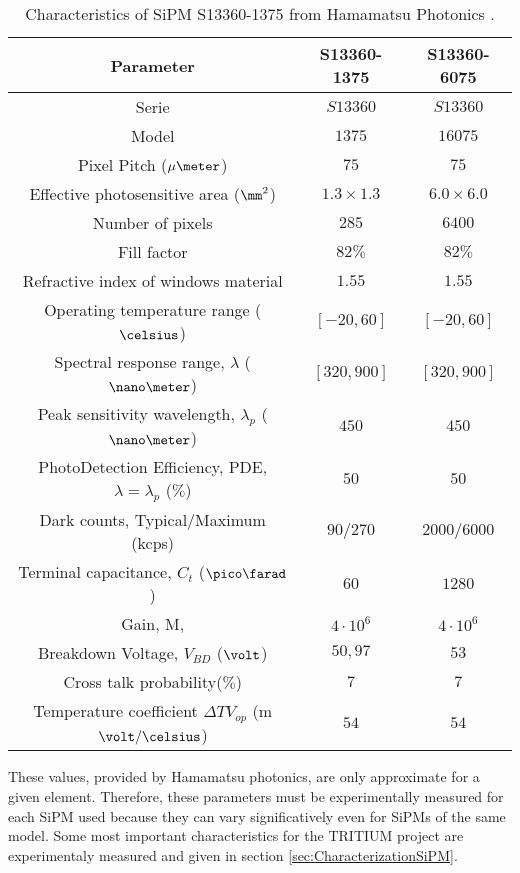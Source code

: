 \begin{table}[h]
\begin{center}
\begin{tabular}{|c|c|c|}
\hline
Parameter & S13360-1375 & S13360-6075 \\
\hline \hline \hline
Serie & $S13360$ & $S13360$ \\ \hline
Model & $1375$ & $16075$ \\ \hline
Pixel Pitch ($\mu\meter$) & $75$ & $75$ \\ \hline
Effective photosensitive area ($\mm^2$) & $1.3 \times 1.3$ & $6.0 \times 6.0$ \\ \hline
Number of pixels & $285$ & $6400$ \\ \hline
Fill factor & $82\%$ & $82\%$ \\ \hline
Refractive index of windows material & $1.55$ & $1.55$ \\ \hline
Operating temperature range ($\celsius$) & $[-20,60]$ & $[-20,60]$ \\ \hline
Spectral response range, $\lambda$ ($\nano\meter$) & $[320, 900]$ & $[320, 900]$ \\ \hline
Peak sensitivity wavelength, $\lambda_p$ ($\nano\meter$) & $450$ & $450$ \\ \hline
PhotoDetection Efficiency, PDE, $\lambda=\lambda_p$ ($\%$) & $50$ & $50$ \\ \hline
Dark counts, Typical/Maximum (kcps) & $90/270$ & $2000/6000$ \\ \hline
Terminal capacitance, $C_t$ ($\pico\farad$) & $60$ & $1280$ \\ \hline
Gain, M, & $4 \cdot{} 10^6$ & $4 \cdot{} 10^6$ \\ \hline
Breakdown Voltage, $V_{BD}$ ($\volt$) & $50,97$ & $53$ \\ \hline
Cross talk probability($\%$) & $7$ & $7$ \\ \hline
Temperature coefficient $\Delta TV_{op}$ (m$\volt/\celsius$) & $54$ & $54$ \\ \hline
\end{tabular}
\caption{Characteristics of SiPM S13360-1375 from Hamamatsu Photonics \cite{DataSheetHammamatsu_1_SiPM_1375}.}
\label{tab:PropertiesOfSiPM1375}
\end{center}
\end{table}

These values, provided by Hamamatsu photonics, are only approximate for a given element. Therefore, these parameters must be experimentally measured for each SiPM used because they can vary significatively even for SiPMs of the same model. Some most important characteristics for the TRITIUM project are experimentaly measured and given in section \ref{sec:CharacterizationSiPM}. 

